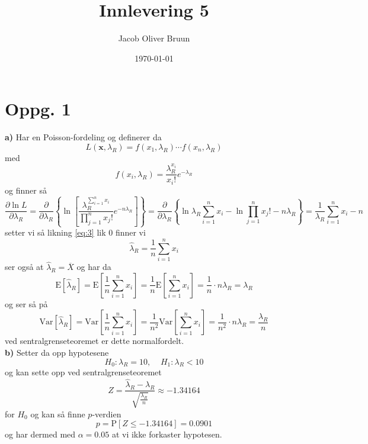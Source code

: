 \documentclass{report}
\title{Innlevering 5}
\author{Jacob Oliver Bruun}
\date{\today}
\newcommand{\bbrack}[1]{\left[ #1 \right]}
\newcommand{\cbrack}[1]{\left\lbrace #1 \right\rbrace}
\newcommand{\Var}[1]{\text{Var} \bbrack{ #1 }}
\newcommand{\fvv}[1]{\text{E} \bbrack{ #1 }}
\newcommand{\Prob}[1]{\text{P} \bbrack{ #1 }}
\begin{document}
\section*{Oppg. 1}
\textbf{a)}
Har en Poisson-fordeling og definerer da
\begin{equation}
  \label{eq:1}
  L(\mathbf{x}, \lambda_{R}) = f(x_{1}, \lambda_{R}) \cdots f(x_{n}, \lambda_{R})
\end{equation}
med
\begin{equation}
  \label{eq:2}
  f(x_{i}, \lambda_{R}) = \frac{\lambda_{R}^{x_{i}}}{x_{i}!} e^{-\lambda_{R}}
\end{equation}
og finner så
\begin{equation}
  \label{eq:3}
  \frac{\partial \ln L}{\partial \lambda_{R}} = \frac{\partial}{\partial \lambda_{R}} \cbrack{ \ln \bbrack{ \frac{\lambda_{R}^{\sum_{i=1}^{n} x_{i}}}{\prod_{j=1}^{n}x_{j}!} e^{-n\lambda_{R}} } } = \frac{\partial}{\partial \lambda_{R}} \cbrack{ \ln \lambda_{R} \sum_{i=1}^{n}x_{i} - \ln \prod_{j=1}^{n}x_{j}! - n\lambda_{R}} = \frac{1}{\lambda_{R}} \sum_{i=1}^{n}x_{i} - n
\end{equation}
setter vi så likning \eqref{eq:3} lik 0 finner vi
\begin{equation}
  \label{eq:4}
  \widehat{\lambda}_{R} = \frac{1}{n} \sum_{i=1}^{n} x_{i}
\end{equation}
ser også at $\widehat{\lambda}_{R} = \overline{X}$ og har da
\begin{equation}
  \label{eq:5}
  \fvv{\widehat{\lambda}_{R}} = \fvv{ \frac{1}{n} \sum_{i=1}^{n} x_{i} } = \frac{1}{n} \fvv{ \sum_{i=1}^{n} x_{i}} = \frac{1}{n} \cdot n\lambda_{R} = \lambda_{R}
\end{equation}
og ser så på
\begin{equation}
  \label{eq:6}
  \Var{\widehat{\lambda}_{R}} = \Var{\frac{1}{n} \sum_{i=1}^{n} x_{i}} = \frac{1}{n^{2}} \Var{\sum_{i=1}^{n} x_{i}} = \frac{1}{n^{2}} \cdot n\lambda_{R} = \frac{\lambda_{R}}{n}
\end{equation}
ved sentralgrenseteoremet er dette normalfordelt. \\

\textbf{b)}
Setter da opp hypotesene
\begin{equation}
  \label{eq:7}
  H_{0} : \lambda_{R} = 10, \;\;\;\; H_{1} : \lambda_{R} < 10
\end{equation}
og kan sette opp ved sentralgrenseteoremet
\begin{equation}
  \label{eq:8}
  Z = \frac{\widehat{\lambda}_{R} - \lambda_{R}}{\sqrt{\frac{\lambda_{R}}{n}}} \approx -1.34164
\end{equation}
for $H_{0}$ og kan så finne $p$-verdien
\begin{equation}
  \label{eq:9}
  p = \Prob{ Z \leq -1.34164 } = 0.0901
\end{equation}
og har dermed med $\alpha = 0.05$ at vi ikke forkaster hypotesen. \\
\end{document}
